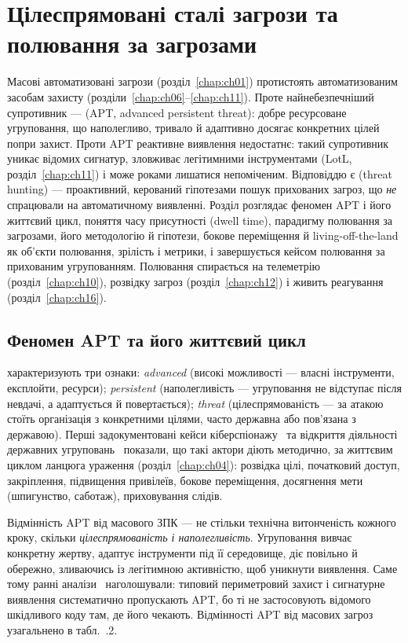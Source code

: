 \chapter{Цілеспрямовані сталі загрози та полювання за загрозами}
\label{chap:ch13}

Масові автоматизовані загрози (розділ~\ref{chap:ch01}) протистоять автоматизованим засобам захисту (розділи~\ref{chap:ch06}--\ref{chap:ch11}). Проте найнебезпечніший супротивник ---  (APT, advanced persistent threat): добре ресурсоване угруповання, що наполегливо, тривало й адаптивно досягає конкретних цілей попри захист. Проти APT реактивне виявлення недостатнє: такий супротивник уникає відомих сигнатур, зловживає легітимними інструментами (LotL, розділ~\ref{chap:ch11}) і може роками лишатися непоміченим. Відповіддю є  (threat hunting) --- проактивний, керований гіпотезами пошук прихованих загроз, що \emph{не} спрацювали на автоматичному виявленні. Розділ розглядає феномен APT і його життєвий цикл, поняття часу присутності (dwell time), парадигму полювання за загрозами, його методологію й гіпотези, бокове переміщення й living-off-the-land як об'єкти полювання, зрілість і метрики, і завершується кейсом полювання за прихованим угрупованням. Полювання спирається на телеметрію (розділ~\ref{chap:ch10}), розвідку загроз (розділ~\ref{chap:ch12}) і живить реагування (розділ~\ref{chap:ch16}).

\section{Феномен APT та його життєвий цикл}\label{sec:ch13-apt}

 характеризують три ознаки: \emph{advanced} (високі можливості --- власні інструменти, експлойти, ресурси); \emph{persistent} (наполегливість --- угруповання не відступає після невдачі, а адаптується й повертається); \emph{threat} (цілеспрямованість --- за атакою стоїть організація з конкретними цілями, часто державна або пов'язана з державою). Перші задокументовані кейси кіберспіонажу~\cite{ch13:stoll} та відкриття діяльності державних угруповань~\cite{ch13:mandiant} показали, що такі актори діють методично, за життєвим циклом ланцюга ураження (розділ~\ref{chap:ch04}): розвідка цілі, початковий доступ, закріплення, підвищення привілеїв, бокове переміщення, досягнення мети (шпигунство, саботаж), приховування слідів.

Відмінність APT від масового ЗПК --- не стільки технічна витонченість кожного кроку, скільки \emph{цілеспрямованість і наполегливість}. Угруповання вивчає конкретну жертву, адаптує інструменти під її середовище, діє повільно й обережно, зливаючись із легітимною активністю, щоб уникнути виявлення. Саме тому ранні аналізи~\cite{ch13:virvilis} наголошували: типовий периметровий захист і сигнатурне виявлення систематично пропускають APT, бо ті не застосовують відомого шкідливого коду там, де його чекають. Відмінності APT від масових загроз узагальнено в табл.~\thechapter.2.

